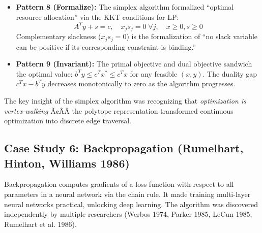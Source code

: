 \begin{itemize}
\item \textbf{Pattern 8 (Formalize):} The simplex algorithm formalized ``optimal resource allocation'' via the KKT conditions for LP:
\[
A^T y + s = c, \quad x_j s_j = 0 \; \forall j, \quad x \ge 0, s \ge 0
\]
Complementary slackness ($x_j s_j = 0$) is the formalization of ``no slack variable can be positive if its corresponding constraint is binding.''

\item \textbf{Pattern 9 (Invariant):} The primal objective and dual objective sandwich the optimal value: $b^T y \le c^T x^* \le c^T x$ for any feasible $(x, y)$. The duality gap $c^T x - b^T y$ decreases monotonically to zero as the algorithm progresses.
\end{itemize}

\begin{mentalLeap}The key insight of the simplex algorithm was recognizing that \emph{optimization is vertex-walking} Ã¢ÂÂ the polytope representation transformed continuous optimization into discrete edge traversal.\end{mentalLeap}

\subsection{Case Study 6: Backpropagation (Rumelhart, Hinton, Williams 1986)}

Backpropagation computes gradients of a loss function with respect to all parameters in a neural network via the chain rule. It made training multi-layer neural networks practical, unlocking deep learning. The algorithm was discovered independently by multiple researchers (Werbos 1974, Parker 1985, LeCun 1985, Rumelhart et al. 1986).


